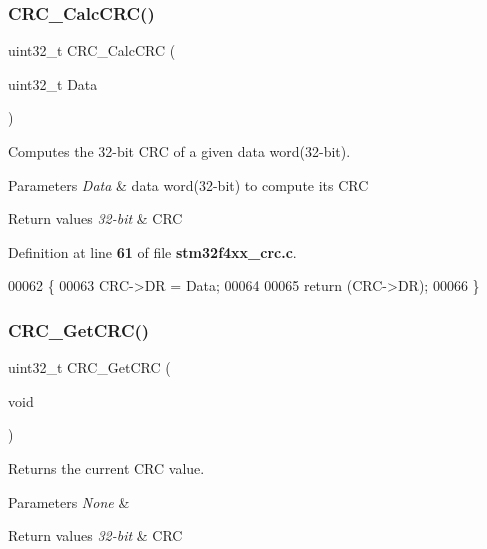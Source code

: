 \subsubsection{C\+R\+C\+\_\+\+Calc\+C\+R\+C()}
{\footnotesize\ttfamily uint32\+\_\+t C\+R\+C\+\_\+\+Calc\+C\+RC (\begin{DoxyParamCaption}\item[{uint32\+\_\+t}]{Data }\end{DoxyParamCaption})}



Computes the 32-\/bit C\+RC of a given data word(32-\/bit). 


\begin{DoxyParams}{Parameters}
{\em Data} & data word(32-\/bit) to compute its C\+RC \\
\hline
\end{DoxyParams}

\begin{DoxyRetVals}{Return values}
{\em 32-\/bit} & C\+RC \\
\hline
\end{DoxyRetVals}


Definition at line \textbf{ 61} of file \textbf{ stm32f4xx\+\_\+crc.\+c}.


\begin{DoxyCode}
00062 \{
00063   CRC->DR = Data;
00064   
00065   \textcolor{keywordflow}{return} (CRC->DR);
00066 \}
\end{DoxyCode}
\mbox{\label{group__CRC_gab62db4561b0558f3c8ed53887fe7de8b}} 
\subsubsection{C\+R\+C\+\_\+\+Get\+C\+R\+C()}
{\footnotesize\ttfamily uint32\+\_\+t C\+R\+C\+\_\+\+Get\+C\+RC (\begin{DoxyParamCaption}\item[{void}]{ }\end{DoxyParamCaption})}



Returns the current C\+RC value. 


\begin{DoxyParams}{Parameters}
{\em None} & \\
\hline
\end{DoxyParams}

\begin{DoxyRetVals}{Return values}
{\em 32-\/bit} & C\+RC \\
\hline
\end{DoxyRetVals}


